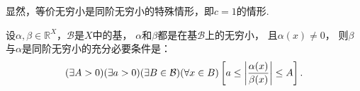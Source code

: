 显然，等价无穷小是同阶无穷小的特殊情形，即\(c=1\)的情形.

\begin{proposition}
设\(\alpha,\beta\in\mathbb{R}^X\)，\(\mathcal{B}\)是\(X\)中的基，
\(\alpha\)和\(\beta\)都是在基\(\mathcal{B}\)上的无穷小，
且\(\alpha(x)\neq0\)，
则\(\beta\)与\(\alpha\)是同阶无穷小的充分必要条件是：\[
	(\exists A>0)
	(\exists a>0)
	(\exists B\in\mathcal{B})
	(\forall x\in B)
	\left[
		a \leq \abs{\frac{\alpha(x)}{\beta(x)}} \leq A
	\right].
\]
\end{proposition}
